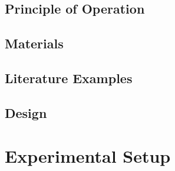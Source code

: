\subsection{Principle of Operation}
\subsection{Materials}
\subsection{Literature Examples}
\subsection{Design}

\section{Experimental Setup}